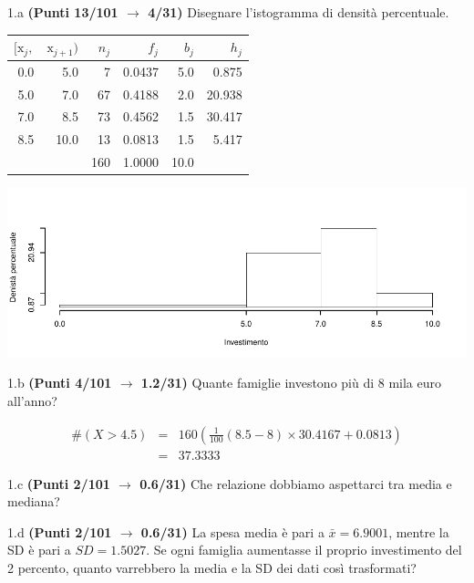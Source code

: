 \documentclass[
  11pt,
]{book}
\theoremstyle{mytheoremstyle}
\theoremstyle{mydefstyle}
\newenvironment{sol}
  {
  \begin{tcolorbox}[enhanced,breakable,arc=0.1mm,boxrule=1pt,colback=white,colframe=iblue,
  title=\bf \fontfamily{lmss}\selectfont \hspace{.5 cm} Soluzione,drop fuzzy shadow]

}{
\end{tcolorbox}
  }
\begin{document}
1.a \textbf{(Punti 13/101 \(\rightarrow\) 4/31)} Disegnare l'istogramma di densità percentuale.

\begin{sol}

\begin{table}[H]
\centering
\begin{tabular}{rrrrrr}
\toprule
$[\text{x}_j,$ & $\text{x}_{j+1})$ & $n_j$ & $f_j$ & $b_j$ & $h_j$\\
\midrule
0.0 & 5.0 & 7 & 0.0437 & 5.0 & 0.875\\
5.0 & 7.0 & 67 & 0.4188 & 2.0 & 20.938\\
7.0 & 8.5 & 73 & 0.4562 & 1.5 & 30.417\\
8.5 & 10.0 & 13 & 0.0813 & 1.5 & 5.417\\
 &  & 160 & 1.0000 & 10.0 & \\
\bottomrule
\end{tabular}
\end{table}

\begin{center}\includegraphics{Esami_passati_con_soluzioni_files/figure-latex/2023-117-1} \end{center}

\end{sol}

1.b \textbf{(Punti 4/101 \(\rightarrow\) 1.2/31)} Quante famiglie investono più di 8 mila euro all'anno?

\begin{sol}
\begin{eqnarray*}
  \#(X>4.5) &=&  160(\frac1{100}(8.5-8)\times30.4167+0.0813)\\
  &=& 37.3333
\end{eqnarray*}

\end{sol}

1.c \textbf{(Punti 2/101 \(\rightarrow\) 0.6/31)} Che relazione dobbiamo aspettarci tra media e mediana?

1.d \textbf{(Punti 2/101 \(\rightarrow\) 0.6/31)} La spesa media è pari a \(\bar x=6.9001\), mentre la SD è pari a \(SD=1.5027\).
Se ogni famiglia aumentasse il proprio investimento del 2 percento, quanto varrebbero la media e la SD dei dati così trasformati?
\end{document}

